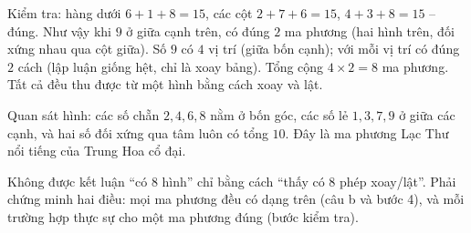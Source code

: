 {\begin{figC}
\end{figC}
Kiểm tra: hàng dưới $6 + 1 + 8 = 15$, các cột $2 + 7 + 6 = 15$, $4 + 3 + 8 = 15$ -- đúng. Như vậy khi $9$ ở giữa cạnh trên, có đúng
$2$ ma phương (hai hình trên, đối xứng nhau qua cột giữa).
Số $9$ có $4$ vị trí (giữa bốn cạnh); với mỗi vị trí có đúng $2$ cách (lập luận giống hệt, chỉ là xoay bảng). Tổng cộng
$4\times 2 = 8$ ma phương. Tất cả đều thu được từ một hình bằng cách xoay và lật.
\begin{tipbox}Quan sát hình: các số chẵn $2, 4, 6, 8$ nằm ở bốn góc, các số lẻ $1, 3, 7, 9$ ở giữa các cạnh, và hai số đối xứng qua
tâm luôn có tổng $10$. Đây là ma phương Lạc Thư nổi tiếng của Trung Hoa cổ đại.\end{tipbox}
\begin{warnbox}Không được kết luận ``có $8$ hình'' chỉ bằng cách ``thấy có $8$ phép xoay/lật''. Phải chứng minh hai điều: mọi ma
phương đều có dạng trên (câu b và bước 4), và mỗi trường hợp thực sự cho một ma phương đúng (bước kiểm tra).\end{warnbox}
}

